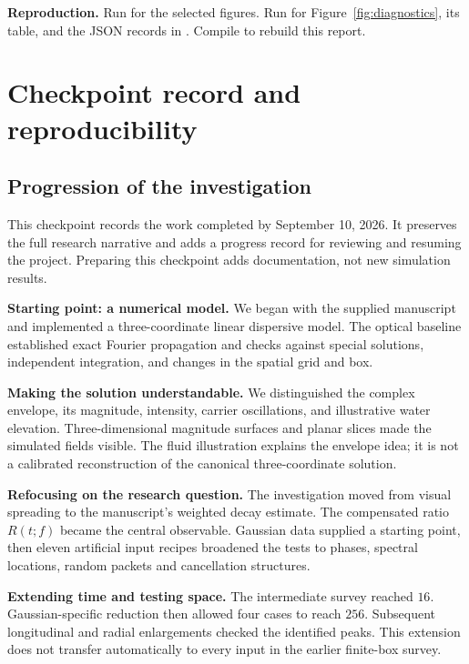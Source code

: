\documentclass[10pt,letterpaper]{article}
\numberwithin{equation}{section}
\begin{document}
\begingroup\raggedright\textbf{Reproduction.} Run  for the selected figures.
Run  for Figure~\ref{fig:diagnostics}, its table, and the
JSON records in . Compile
 to rebuild this report.\par\endgroup

\section{Checkpoint record and reproducibility}

\subsection{Progression of the investigation}\label{checkpoint}
This checkpoint records the work completed by September 10, 2026. It preserves the
full research narrative and adds a progress record for reviewing and resuming the
project. Preparing this checkpoint adds documentation, not new simulation results.

\textbf{Starting point: a numerical model.} We began with the supplied manuscript
and implemented a three-coordinate linear dispersive model. The optical baseline
established exact Fourier propagation and checks against special solutions,
independent integration, and changes in the spatial grid and box.

\textbf{Making the solution understandable.} We distinguished the complex envelope,
its magnitude, intensity, carrier oscillations, and illustrative water elevation.
Three-dimensional magnitude surfaces and planar slices made the simulated fields
visible. The fluid illustration explains the envelope idea; it is not a calibrated
reconstruction of the canonical three-coordinate solution.

\textbf{Refocusing on the research question.} The investigation moved from visual
spreading to the manuscript's weighted decay estimate. The compensated ratio
$R(t;f)$ became the central observable. Gaussian data supplied a starting point,
then eleven artificial input recipes broadened the tests to phases, spectral
locations, random packets and cancellation structures.

\textbf{Extending time and testing space.} The intermediate survey reached $16$.
Gaussian-specific reduction then allowed four cases to reach $256$. Subsequent
longitudinal and radial enlargements checked the identified peaks. This extension
does not transfer automatically to every input in the earlier finite-box survey.
\end{document}
